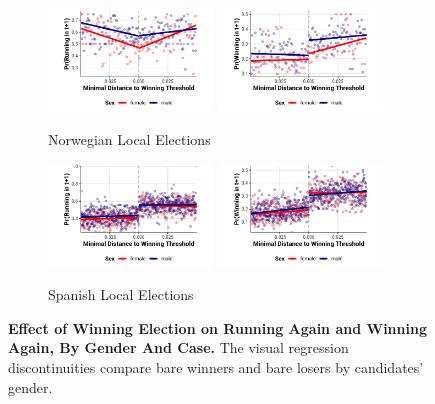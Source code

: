 \documentclass[12pt]{article}
\begin{document}
\begin{figure}[!htb]
    \centering
    \begin{subfigure}[t]{0.98\textwidth}
        \includegraphics[width = 0.48\textwidth]{../output/figures/norway_run_again.pdf}
        \includegraphics[width = 0.48\textwidth]{../output/figures/norway_win_again.pdf}
        \caption{Norwegian Local Elections \label{fig:main_plot_norway}}
    \end{subfigure}
    \begin{subfigure}[t]{0.98\textwidth}
        \includegraphics[width = 0.48\textwidth]{../output/figures/spain_run_again.pdf}
        \includegraphics[width = 0.48\textwidth]{../output/figures/spain_win_again.pdf}
        \caption{Spanish Local Elections \label{fig:main_plot_spain}}
    \end{subfigure}
    \caption{\textbf{Effect of Winning Election on Running Again and Winning Again, By Gender And Case.} The visual regression discontinuities compare bare winners and bare losers by candidates' gender.}
    \label{fig:main_plot}
\end{figure}
\end{document}
